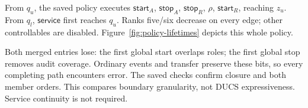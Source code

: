 From $q_u$, the saved policy executes $\mathsf{start}_A$, $\mathsf{stop}_A$, $\mathsf{stop}_R$, $\rho$, $\mathsf{start}_R$, reaching $z_u$. From $q_l$, $\mathsf{service}$ first reaches $q_u$. Ranks five/six decrease on every edge; other controllables are disabled. Figure~\ref{fig:policy-lifetimes} depicts this whole policy.

Both merged entries lose: the first global start overlaps roles; the first global stop removes audit coverage. Ordinary events and transfer preserve these bits, so every completing path encounters error. The saved checks confirm closure and both member orders. This compares boundary granularity, not DUCS expressiveness. Service continuity is not required.

